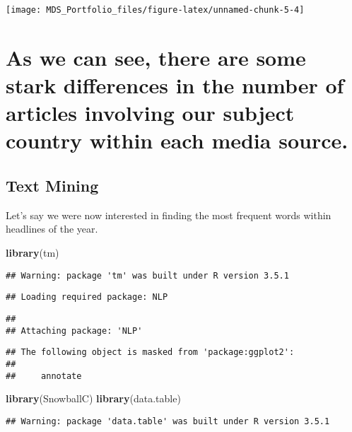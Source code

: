 \documentclass[]{article}
\newenvironment{Shaded}{\begin{snugshade}}{\end{snugshade}}
\newcommand{\KeywordTok}[1]{\textcolor[rgb]{0.13,0.29,0.53}{\textbf{#1}}}
\newcommand{\NormalTok}[1]{#1}
\begin{document}
\begin{center}\texttt{[image: MDS\_Portfolio\_files/figure-latex/unnamed-chunk-5-4]} \end{center}

\section{As we can see, there are some stark differences in the number
of articles involving our subject country within each media
source.}\label{as-we-can-see-there-are-some-stark-differences-in-the-number-of-articles-involving-our-subject-country-within-each-media-source.}

\subsection{Text Mining}\label{text-mining}

Let's say we were now interested in finding the most frequent words
within headlines of the year.

\begin{Shaded}
\begin{Highlighting}[]
\KeywordTok{library}\NormalTok{(tm)}
\end{Highlighting}
\end{Shaded}

\begin{verbatim}
## Warning: package 'tm' was built under R version 3.5.1
\end{verbatim}

\begin{verbatim}
## Loading required package: NLP
\end{verbatim}

\begin{verbatim}
## 
## Attaching package: 'NLP'
\end{verbatim}

\begin{verbatim}
## The following object is masked from 'package:ggplot2':
## 
##     annotate
\end{verbatim}

\begin{Shaded}
\begin{Highlighting}[]
\KeywordTok{library}\NormalTok{(SnowballC)}
\KeywordTok{library}\NormalTok{(data.table)}
\end{Highlighting}
\end{Shaded}

\begin{verbatim}
## Warning: package 'data.table' was built under R version 3.5.1
\end{verbatim}
\end{document}
